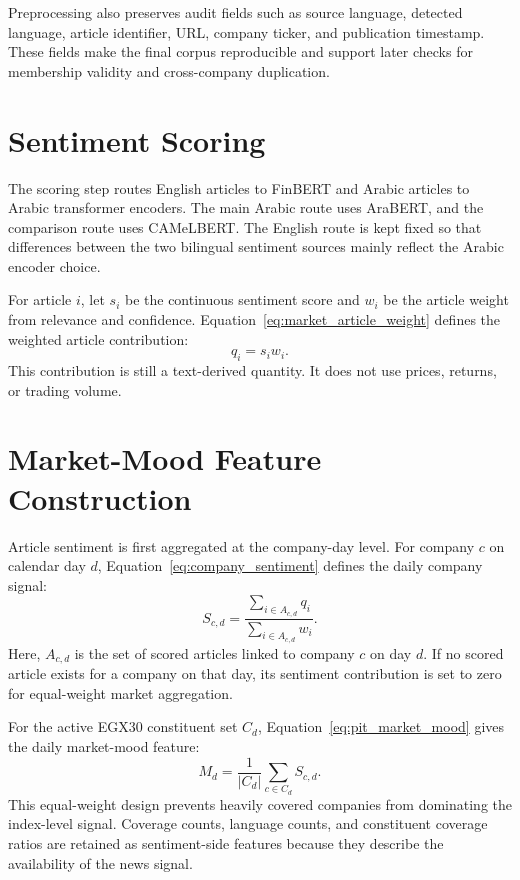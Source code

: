 Preprocessing also preserves audit fields such as source language, detected language, article identifier, URL, company ticker, and publication timestamp. These fields make the final corpus reproducible and support later checks for membership validity and cross-company duplication.

\section{Sentiment Scoring}

The scoring step routes English articles to FinBERT and Arabic articles to Arabic transformer encoders. The main Arabic route uses AraBERT, and the comparison route uses CAMeLBERT. The English route is kept fixed so that differences between the two bilingual sentiment sources mainly reflect the Arabic encoder choice.

For article $i$, let $s_i$ be the continuous sentiment score and $w_i$ be the article weight from relevance and confidence. Equation~\ref{eq:market_article_weight} defines the weighted article contribution:
\begin{equation}
q_i = s_i w_i.
\label{eq:market_article_weight}
\end{equation}
This contribution is still a text-derived quantity. It does not use prices, returns, or trading volume.

\section{Market-Mood Feature Construction}

Article sentiment is first aggregated at the company-day level. For company $c$ on calendar day $d$, Equation~\ref{eq:company_sentiment} defines the daily company signal:
\begin{equation}
S_{c,d} = \frac{\sum_{i \in A_{c,d}} q_i}{\sum_{i \in A_{c,d}} w_i}.
\label{eq:company_sentiment}
\end{equation}
Here, $A_{c,d}$ is the set of scored articles linked to company $c$ on day $d$. If no scored article exists for a company on that day, its sentiment contribution is set to zero for equal-weight market aggregation.

For the active EGX30 constituent set $C_d$, Equation~\ref{eq:pit_market_mood} gives the daily market-mood feature:
\begin{equation}
M_d = \frac{1}{|C_d|} \sum_{c \in C_d} S_{c,d}.
\label{eq:pit_market_mood}
\end{equation}
This equal-weight design prevents heavily covered companies from dominating the index-level signal. Coverage counts, language counts, and constituent coverage ratios are retained as sentiment-side features because they describe the availability of the news signal.

